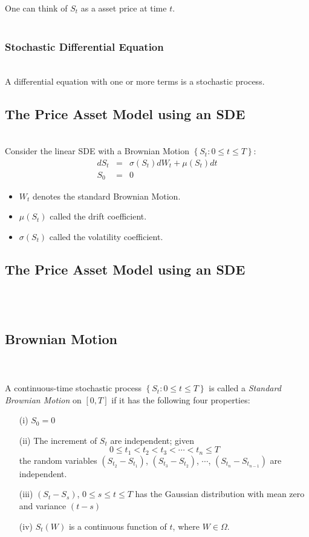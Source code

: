 One can think of $S_t$ as a asset price at time $t$.\\\\
\subsubsection{Stochastic Differential Equation}\\
A differential equation with one or more terms is a stochastic process.

\subsection{The Price Asset Model using an SDE}\\
Consider the linear SDE with a Brownian Motion $\left\lbrace S_t: 0\leq t\leq T\right\rbrace$:
\begin{equation}\label{eqnModelling4-1}
\begin{array}{rcl}
dS_t &=& \sigma(S_t)dW_t+\mu(S_t)dt\\
S_0 &=& 0
\end{array}
\end{equation}
\begin{itemize}
\item $W_{t}$ denotes the standard Brownian Motion.
\item $\mu(S_{t})$ called the drift coefficient.
\item $\sigma(S_{t})$ called the volatility coefficient.
\end{itemize}

\subsection{The Price Asset Model using an SDE}\\\\
\subsection{Brownian Motion}\\\\
A continuous-time stochastic process $\left\lbrace S_{t}: 0\leq t\leq T\right\rbrace$ is called a \textit{Standard
Brownian Motion} on $ \left[ 0, T\right]$ if it has the following four properties:
\begin{itemize}
\item[(i)]$S_{0} =0$
\item[(ii)] The increment of $S_{t}$ are independent; given $$0\leq t_{1}< t_{2}< t_{3}<\cdots<t_{n}\leq T$$ the random
variables $\left( S_{t_{2}} -S_{t_{1}}\right)$, $\left(S_{t_{3}} -S_{t_{2}} \right)$, $\cdots$, $\left( S_{t_{n}}
-S_{t_{n-1}}\right)$  are independent.
\item[(iii)]$\left( S_{t} -S_{s}\right)$, $0\leq s\leq t\leq T$ has the Gaussian distribution with mean zero and
variance $\left( t-s \right) $
\item[(iv)]$S_{t}(W)$ is a continuous function of $t$, where $W \in \Omega$.
\end{itemize} 





